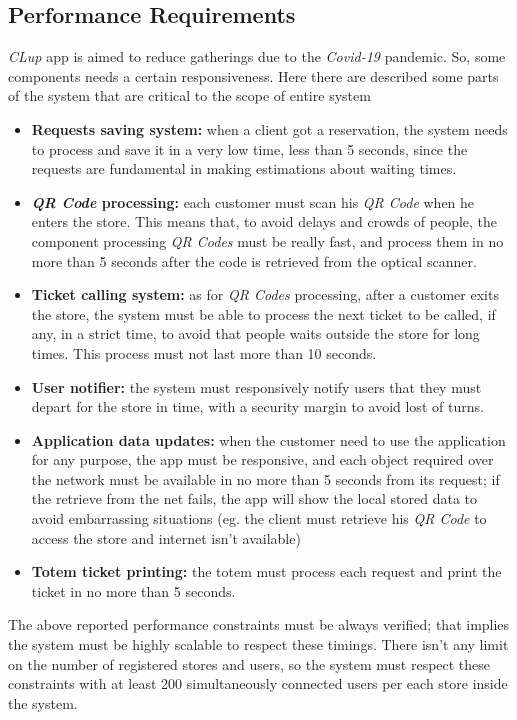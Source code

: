 \documentclass{article}
\begin{document}
	\subsection{Performance Requirements}
	\emph{CLup} app is aimed to reduce gatherings due to the \emph{Covid-19} pandemic. So, some components needs a certain responsiveness. Here there are described some parts of the system that are critical to the scope of entire system
	\begin{itemize}
		\item {\bfseries Requests saving system:} when a client got a reservation, the system needs to process and save it in a very low time, less than 5 seconds, since the requests are fundamental in making estimations about waiting times.
		\item {\bfseries \emph{QR Code} processing:} each customer must scan his \emph{QR Code} when he enters the store. This means that, to avoid delays and crowds of people, the component processing \emph{QR Codes} must be really fast, and process them in no more than 5 seconds after the code is retrieved from the optical scanner.
		\item {\bfseries Ticket calling system:} as for \emph{QR Codes} processing, after a customer exits the store, the system must be able to process the next ticket to be called, if any, in a strict time, to avoid that people waits outside the store for long times. This process must not last more than 10 seconds.
		\item {\bfseries User notifier:} the system must responsively notify users that they must depart for the store in time, with a security margin to avoid lost of turns. 
		\item{\bfseries Application data updates:} when the customer need to use the application for any purpose, the app must be responsive, and each object required over the network must be available in no more than 5 seconds from its request; if the retrieve from the net fails, the app will show the local stored data to avoid embarrassing situations  (eg. the client must retrieve his \emph{QR Code} to access the store and internet isn't available) 
		\item{\bfseries Totem ticket printing: } the totem must process each request and print the ticket in no more than 5 seconds.
	\end{itemize} 
The above reported performance constraints must be always verified; that implies the system must be highly scalable to respect these timings. There isn't any limit on the number of registered stores and users, so the system must respect these constraints with at least 200 simultaneously connected users per each store inside the system.
\end{document}
